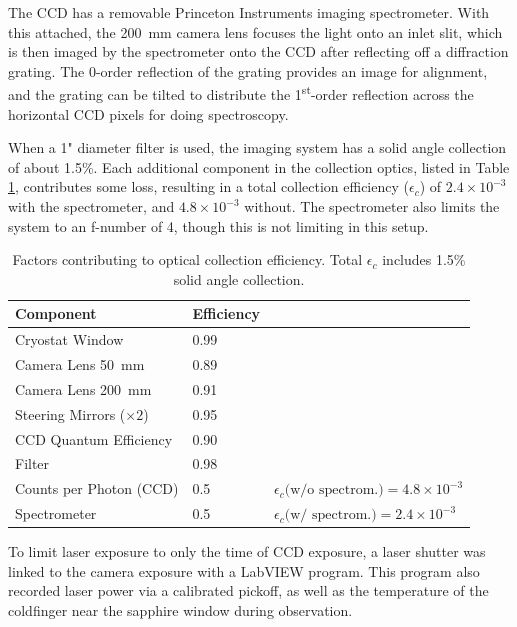 The CCD has a removable Princeton Instruments imaging spectrometer.  With this attached, the 200~mm camera lens focuses the light onto an inlet slit, which is then imaged by the spectrometer onto the CCD after reflecting off a diffraction grating.  The 0-order reflection of the grating provides an image for alignment, and the grating can be tilted to distribute the 1\textsuperscript{st}-order reflection across the horizontal CCD pixels for doing spectroscopy.

When a 1" diameter filter is used, the imaging system has a solid angle collection of about 1.5\%.  Each additional component in the collection optics, listed in Table \ref{table:colleff}, contributes some loss, resulting in a total collection efficiency ($\epsilon_{c}$) of $2.4 \times 10^{-3}$ with the spectrometer, and $4.8 \times 10^{-3}$ without.  The spectrometer also limits the system to an f-number of 4, though this is not limiting in this setup.

\begin{table} [!htbp]
\caption{Factors contributing to optical collection efficiency.  Total $\epsilon_{c}$ includes 1.5\% solid angle collection.}
\label{table:colleff}
\begin{tabular}{l l l}
Component & Efficiency & \\
\hline
Cryostat Window & 0.99 & \\
Camera Lens 50~mm & 0.89 & \\
Camera Lens 200~mm & 0.91 & \\
Steering Mirrors ($\times 2$) & 0.95 & \\
CCD Quantum Efficiency & 0.90 & \\
Filter & 0.98 & \\
Counts per Photon (CCD) & 0.5 & $\epsilon_{c}\text{(w/o spectrom.)} = 4.8 \times 10^{-3}$\\
\hline
Spectrometer & 0.5 & $\epsilon_{c}\text{(w/ spectrom.)} = 2.4 \times 10^{-3}$\\
\end{tabular}
\end{table}


To limit laser exposure to only the time of CCD exposure, a laser shutter was linked to the camera exposure with a LabVIEW program.  This program also recorded laser power via a calibrated pickoff, as well as the temperature of the coldfinger near the sapphire window during observation.

